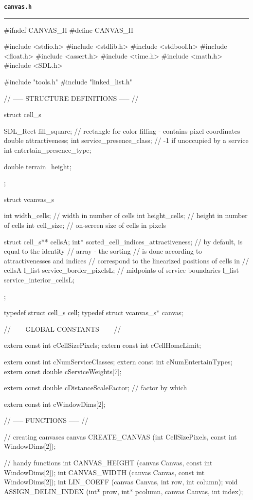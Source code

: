 
\beamertemplatenavigationsymbolsempty



{\Large \texttt{\textbf{canvas.h}}}
\vspace*{1mm}
\hrule
\fontsize{6pt}{6pt}\selectfont
\begin{C}
#ifndef CANVAS_H
#define CANVAS_H

#include <stdio.h>
#include <stdlib.h>
#include <stdbool.h>
#include <float.h>
#include <assert.h>
#include <time.h>
#include <math.h>
#include <SDL.h>

#include "tools.h"
#include "linked_list.h"



// ----- STRUCTURE DEFINITIONS ----- //

struct cell_s {
	SDL_Rect fill_square; // rectangle for color filling - contains pixel coordinates
	double attractiveness;
	int service_presence_class; // -1 if unoccupied by a service
	int entertain_presence_type;
	
	double terrain_height;
};

struct vcanvas_s {
	int width_cells; // width in number of cells
	int height_cells; // height in number of cells
	int cell_size; // on-screen size of cells in pixels
	
	struct cell_s** cellsA;
	int* sorted_cell_indices_attractiveness; // by default, is equal to the identity
	// array - the sorting
	// is done according to attractivenesses and indices
	// correspond to the linearized positions of cells in
	// cellsA
	l_list service_border_pixelsL; // midpoints of service boundaries
	l_list service_interior_cellsL;
};

typedef struct cell_s cell;
typedef struct vcanvas_s* canvas;


// ----- GLOBAL CONSTANTS ----- //

extern const int cCellSizePixels;
extern const int cCellHomeLimit;

extern const int cNumServiceClasses;
extern const int cNumEntertainTypes;
extern const double cServiceWeights[7];

extern const double cDistanceScaleFactor; // factor by which


extern const int cWindowDims[2];


// ----- FUNCTIONS ----- //

// creating canvases
canvas CREATE_CANVAS (int CellSizePixels, const int WindowDims[2]);

// handy functions
int CANVAS_HEIGHT (canvas Canvas, const int WindowDims[2]);
int CANVAS_WIDTH (canvas Canvas, const int WindowDims[2]);
int LIN_COEFF (canvas Canvas, int row, int column);
void ASSIGN_DELIN_INDEX (int* prow, int* pcolumn, canvas Canvas, int index);


\end{C}
